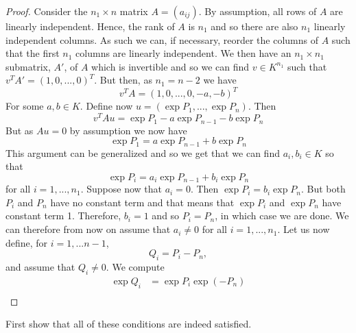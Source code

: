 \documentclass{article}
\begin{document}
\begin{proof}
    Consider the $n_1 \times n$ matrix $A = (a_{ij})$. By assumption, all rows of $A$ are linearly independent. Hence, the rank of $A$ is $n_1$ and so there are also $n_1$ linearly independent columns. As such we can, if necessary, reorder the columns of $A$ such that the first $n_1$ columns are linearly independent. We then have an $n_1 \times n_1$ submatrix, $A'$, of $A$ which is invertible and so we can find $v \in K^{n_1}$ such that $v^T A' = (1, 0,...,0)^T$. But then, as $n_1 = n -2$ we have 
    $$v^T A = (1,0,...,0, -a, -b)^T$$
    For some $a,b \in K$. Define now $u = (\exp P_1, ..., \exp P_n)$. Then
    $$v^T A u = \exp P_1 - a \exp P_{n-1} - b \exp P_n$$
    But as $Au = 0$ by assumption we now have
    $$\exp P_1 = a \exp P_{n-1} + b \exp P_n$$
    This argument can be generalized and so we get that we can find $a_i, b_i \in K$ so that
    $$\exp P_i = a_i \exp P_{n-1} + b_i \exp P_n$$
    for all $i = 1, ..., n_1$. Suppose now that $a_i = 0$. Then $\exp P_i = b_i \exp P_n$. But both $P_i$ and $P_n$ have no constant term and that means that $\exp P_i$ and $\exp P_n$ have constant term 1. Therefore, $b_i = 1$ and so $P_i = P_n$, in which case we are done. We can therefore from now on assume that $a_i \neq 0$ for all $i = 1, ..., n_1$. Let us now define, for $i = 1, ... n-1$,
    $$Q_i = P_i - P_n,$$ 
    and assume that $Q_i \neq 0$. We compute
    \begin{align*}
        \exp Q_i &= \exp P_i \exp (-P_n) \\
        
    \end{align*}

\end{proof}


First show that all of these conditions are indeed satisfied. 
\end{document}

